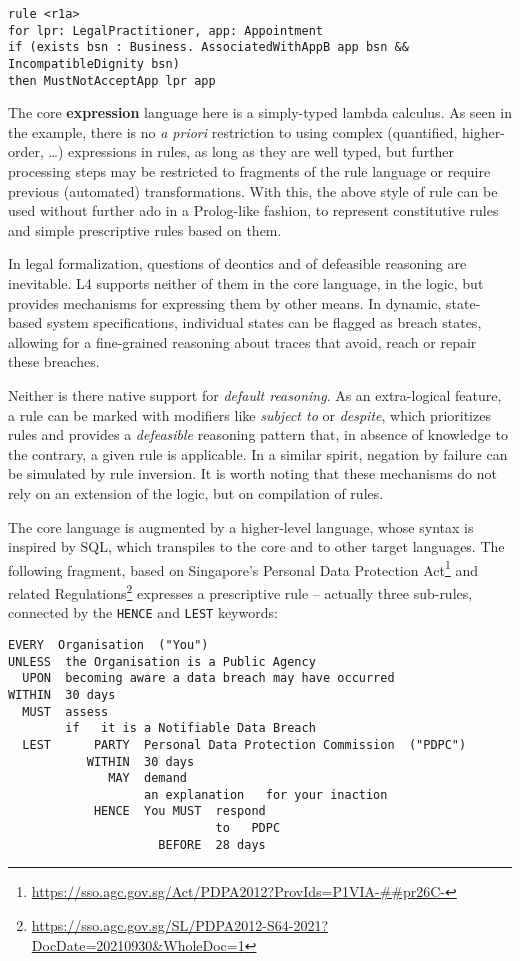 \documentclass[runningheads]{llncs}
\begin{document}
\begin{lstlisting}[language=L4]
rule <r1a>
for lpr: LegalPractitioner, app: Appointment
if (exists bsn : Business. AssociatedWithAppB app bsn && IncompatibleDignity bsn)
then MustNotAcceptApp lpr app
\end{lstlisting}

\noindent The core \textbf{expression} language here is a simply-typed lambda calculus. As seen in
the example, there is no \emph{a priori} restriction to using complex
(quantified, higher-order, \dots) expressions in rules, as long as they are
well typed, but further processing steps may be restricted to fragments of the
rule language or require previous (automated) transformations. With this, the
above style of rule can be used without further ado in a Prolog-like fashion, to represent constitutive rules and simple prescriptive rules based on them.

In legal formalization, questions of deontics and of defeasible reasoning are
inevitable. L4 supports neither of them in the core language, \ie{} in the logic, but
provides mechanisms for expressing them by other means. In dynamic, state-based system
specifications, individual states can be flagged as breach states,
allowing for a fine-grained reasoning about traces that avoid, reach or repair
these breaches.

Neither is there native support for \emph{default reasoning}. As an extra-logical feature, a rule can be marked with
modifiers like \emph{subject to} or \emph{despite}, which prioritizes rules and
provides a \emph{defeasible} reasoning pattern that, in absence
of knowledge to the contrary, a given rule is applicable. In a similar spirit,
negation by failure can be simulated by rule inversion. It is worth noting
that these mechanisms do not rely on an extension of the logic, but on
compilation of rules.

The core language is augmented by a higher-level language, whose syntax is inspired by SQL, which transpiles to the core and to other target languages. The following fragment, based on Singapore's Personal Data Protection Act\footnote{\url{https://sso.agc.gov.sg/Act/PDPA2012?ProvIds=P1VIA-##pr26C-}} and related Regulations\footnote{\url{https://sso.agc.gov.sg/SL/PDPA2012-S64-2021?DocDate=20210930&WholeDoc=1}} expresses a prescriptive rule -- actually three sub-rules, connected by the \texttt{HENCE} and \texttt{LEST} keywords:
\begin{lstlisting}[language=L4Sugary]
 EVERY  Organisation  ("You")
UNLESS  the Organisation is a Public Agency
  UPON  becoming aware a data breach may have occurred
WITHIN  30 days
  MUST  assess
        if   it is a Notifiable Data Breach
  LEST      PARTY  Personal Data Protection Commission  ("PDPC")
           WITHIN  30 days
              MAY  demand
                   an explanation   for your inaction
            HENCE  You MUST  respond
                             to   PDPC
                     BEFORE  28 days
\end{lstlisting}
\end{document}
